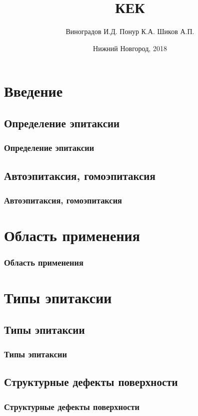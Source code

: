 \documentclass[10pt,pdf,hyperref={unicode}, dvipsnames]{beamer}
\title[КЕК]{КЕК}
\author{%
	Виноградов И.Д. %
	Понур К.А. %
	Шиков А.П. %
}
\institute{Радиофизический факультет ННГУ, 430 группа}
\date{Нижний Новгород, 2018}
\begin{document}
  
\begin{frame}
\titlepage
\end{frame}


\section{Введение}
\subsection{Определение эпитаксии}
\begin{frame}[t]
	\frametitle{Определение эпитаксии}
	
\end{frame}


\subsection{Автоэпитаксия, гомоэпитаксия}
\begin{frame}[t]
	\frametitle{Автоэпитаксия, гомоэпитаксия}
\end{frame}




\section{Область применения}
\begin{frame}[t]
	\frametitle{Область применения}
\end{frame}





\section{Типы эпитаксии}
\subsection{Типы эпитаксии}
\begin{frame}[t]
	\frametitle{Типы эпитаксии}
\end{frame}

\subsection{Структурные дефекты поверхности}
\begin{frame}[t]
	\frametitle{Структурные дефекты поверхности}
\end{frame}
\end{document}
